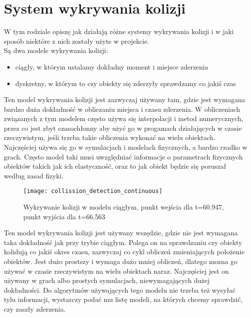 \chapter{System wykrywania kolizji}
\thispagestyle{chapterBeginStyle}
\label{ch:collission_detection}

W tym rodziale opiszę jak działają różne systemy wykrywania kolizji i w jaki sposób niektóre z nich zostały użyte w projekcie.\\

\noindent Są dwa modele wykrywania kolizji:
\begin{itemize}[topsep=0.2em, itemsep=0.5em, partopsep=0em, parsep=0em]
	\item ciągły, w którym ustalamy dokładny moment i miejsce zderzenia
	\item dyskretny, w którym to czy obiekty się zderzyły sprawdzamy co jaki\'s czas
\end{itemize}\bigskip


Ten model wykrywania kolizji jest zazwyczaj używany tam, gdzie jest wymagana bardzo duża dokładno\'sć w obliczaniu miejsca i czasu zderzenia. W obliczeniach związanych z tym modelem często używa się interpolacji i metod numerycznych, przez co jest zbyt czasochłonny aby użyć go w progamach działających w czasie rzeczywistym, je\'sli trzeba takie obliczenia wykonać na wielu obiektach. Najczę\'sciej używa się go w symulacjach i modelach fizycznych, a bardzo rzadko w grach. Często model taki musi uwzględniać informacje o parametrach fizycznych obiektów takich jak ich elastyczno\'sć, oraz to jak obiekt będzie się poruszał według zasad fizyki.\\

\begin{figure}[h]
	\centering
	\noindent\texttt{[image: collission\_detection\_continuous]}
	\caption{Wykrywanie kolizji w modelu ciągłym, punkt wej\'scia dla t=60.947, punkt wyj\'scia dla t=66.563}
\end{figure}
\newpage
{}

Ten model wykrywania kolizji jest używany wszędzie, gdzie nie jest wymagana taka dokładno\'sć jak przy trybie ciągłym. Polega on na sprawdzaniu czy obiekty kolidują co jaki\'s okres czasu, zazwyczaj co cykl obliczeń zmieniających położenie obiektów. Jest dużo prostszy i wymaga dużo mniej obliczeń, dlatego mozna go używać w czasie rzeczywistym na wielu obiektach naraz. Najczę\'sciej jest on używany w grach albo prostych symulacjach, niewymagających dużej dokładno\'sci. Do algorytmów używających tego modelu nie trzeba też wysyłać tylu informacji, wystarczy podać mu listę modeli, na których chcemy sprawdzić, czy zaszły zderzenia.\\

